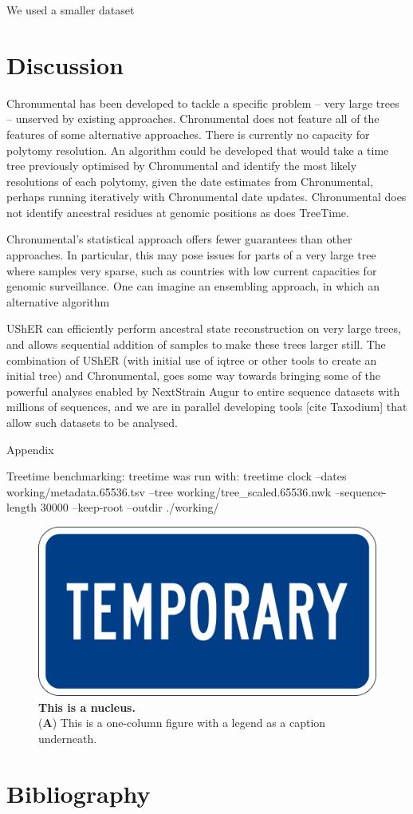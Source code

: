 We used a smaller dataset


\section*{Discussion}


Chronumental has been developed to tackle a specific problem -- very large trees -- unserved by existing approaches. Chronumental does not feature all of the features of some alternative approaches. There is currently no capacity for polytomy resolution. An algorithm could be developed that would take a time tree previously optimised by Chronumental and identify the most likely resolutions of each polytomy, given the date estimates from Chronumental, perhaps running iteratively with Chronumental date updates. Chronumental does not identify ancestral residues at genomic positions as does TreeTime. 

Chronumental's statistical approach offers fewer guarantees than other approaches. In particular, this may pose issues for parts of a very large tree where samples very sparse, such as countries with low current capacities for genomic surveillance. One can imagine an ensembling approach, in which an alternative algorithm

UShER \cite{Turakhia2021-la} can efficiently perform ancestral state reconstruction on very large trees, and allows sequential addition of samples to make these trees larger still. The combination of UShER (with initial use of iqtree \cite{Minh2020-vc} or other tools to create an initial tree) and Chronumental, goes some way towards bringing some of the powerful analyses enabled by NextStrain Augur to entire sequence datasets with millions of sequences, and we are in parallel developing tools [cite Taxodium] that allow such datasets to be analysed.






Appendix

Treetime benchmarking: treetime was run with: treetime clock --dates working/metadata.65536.tsv --tree working/tree\_scaled.65536.nwk --sequence-length 30000  --keep-root --outdir ./working/


\begin{figure}
\centering
\includegraphics[width=0.75\linewidth]{Figures/temp.png}
\caption{\textbf{This is a nucleus.}\\
(\textbf{A}) This is a one-column figure with a legend as a caption underneath.}
\label{fig:nucleus}
\end{figure}


\section*{Bibliography}

